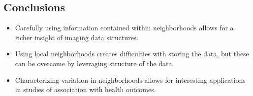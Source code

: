 \documentclass[a0,landscape]{a0poster}
\begin{document}
\begin{multicols}{3}
\large{\section*{\color{uwred}Conclusions}}
\begin{itemize}
\item  Carefully using information contained within neighborhoods allows for a richer insight of imaging data structures.
\item Using local neighborhoods creates difficulties with storing the data, but these can be overcome by leveraging structure of the data.
\item Characterizing variation in neighborhoods allows for interesting applications in studies of association with health outcomes. 
\end{itemize}


\end{multicols}
\end{document}
